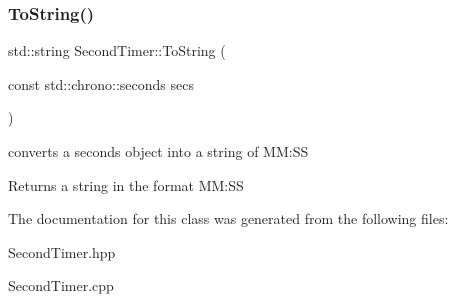 \subsubsection{\texorpdfstring{To\+String()}{ToString()}}
{\footnotesize\ttfamily std\+::string Second\+Timer\+::\+To\+String (\begin{DoxyParamCaption}\item[{const std\+::chrono\+::seconds}]{secs }\end{DoxyParamCaption})\hspace{0.3cm}{\ttfamily [static]}}

converts a seconds object into a string of MM\+:SS \begin{DoxyReturn}{Returns}
a string in the format MM\+:SS 
\end{DoxyReturn}


The documentation for this class was generated from the following files\+:\begin{DoxyCompactItemize}
\item 
Second\+Timer.\+hpp\item 
Second\+Timer.\+cpp\end{DoxyCompactItemize}
